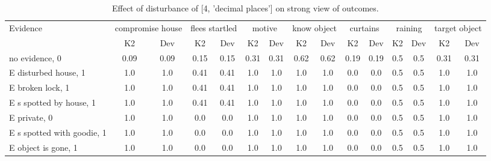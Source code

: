 \begin{table}\begin{tabular}{l|cc|cc|cc|cc|cc|cc|cc}\toprule\multirow{2}{*}{Evidence} & \multicolumn{2}{c}{compromise house}& \multicolumn{2}{c}{flees startled}& \multicolumn{2}{c}{motive}& \multicolumn{2}{c}{know object}& \multicolumn{2}{c}{curtains}& \multicolumn{2}{c}{raining}& \multicolumn{2}{c}{target object}\\& {K2} & {Dev}& {K2} & {Dev}& {K2} & {Dev}& {K2} & {Dev}& {K2} & {Dev}& {K2} & {Dev}& {K2} & {Dev}\\\midrule
no evidence, 0 & 0.09&0.09&0.15&0.15&0.31&0.31&0.62&0.62&0.19&0.19&0.5&0.5&0.31&0.31\\E disturbed house, 1 & 1.0&1.0&0.41&0.41&1.0&1.0&1.0&1.0&0.0&0.0&0.5&0.5&1.0&1.0\\E broken lock, 1 & 1.0&1.0&0.41&0.41&1.0&1.0&1.0&1.0&0.0&0.0&0.5&0.5&1.0&1.0\\E s spotted by house, 1 & 1.0&1.0&0.41&0.41&1.0&1.0&1.0&1.0&0.0&0.0&0.5&0.5&1.0&1.0\\E private, 0 & 1.0&1.0&0.0&0.0&1.0&1.0&1.0&1.0&0.0&0.0&0.5&0.5&1.0&1.0\\E s spotted with goodie, 1 & 1.0&1.0&0.0&0.0&1.0&1.0&1.0&1.0&0.0&0.0&0.5&0.5&1.0&1.0\\E object is gone, 1 & 1.0&1.0&0.0&0.0&1.0&1.0&1.0&1.0&0.0&0.0&0.5&0.5&1.0&1.0\\\bottomrule\end{tabular}\caption{Effect of disturbance of [4, 'decimal places'] on strong view of outcomes.}\end{table}